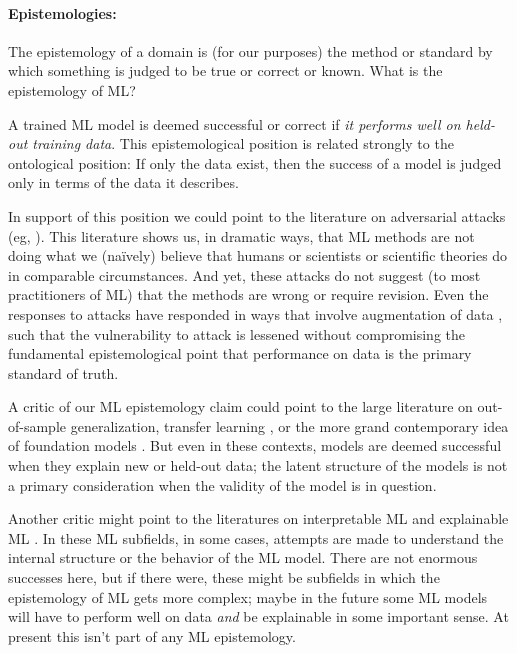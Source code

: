\documentclass[10pt]{article}
\begin{document}
\paragraph{Epistemologies:}
The epistemology of a domain is (for our purposes) the method or standard by which something is judged to be true or correct or known.
What is the epistemology of ML?

A trained ML model is deemed successful or correct if \emph{it performs well on held-out training data}.
This epistemological position is related strongly to the ontological position:
If only the data exist, then the success of a model is judged only in terms of the data it describes.

In support of this position we could point to the literature on adversarial attacks (eg, \citealt{adversarial1}).
This literature shows us, in dramatic ways, that ML methods are not doing what we (na\"ively) believe that humans or scientists or scientific theories do in comparable circumstances.
And yet, these attacks do not suggest (to most practitioners of ML) that the methods are wrong or require revision.
Even the responses to attacks have responded in ways that involve augmentation of data \cite{adversarial_training}, such that the vulnerability to attack is lessened without compromising the fundamental epistemological point that performance on data is the primary standard of truth.

A critic of our ML epistemology claim could point to the large literature on out-of-sample generalization, transfer learning \cite{transfer}, or the more grand contemporary idea of foundation models \cite{foundation}.
But even in these contexts, models are deemed successful when they explain new or held-out data; the latent structure of the models is not a primary consideration when the validity of the model is in question.

Another critic might point to the literatures on interpretable ML \cite{interpretable} and explainable ML \cite{explainable}.
In these ML subfields, in some cases, attempts are made to understand the internal structure or the behavior of the ML model.
There are not enormous successes here, but if there were, these might be subfields in which the epistemology of ML gets more complex; maybe in the future some ML models will have to perform well on data \emph{and} be explainable in some important sense.
At present this isn't part of any ML epistemology.
\end{document}
